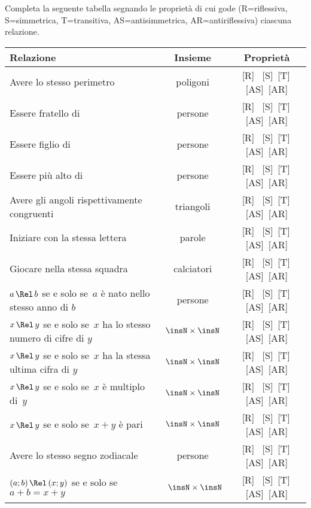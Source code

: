 \begin{exrig}
 \begin{esempio}

Completa la seguente tabella segnando le proprietà di cui gode (R=riflessiva, S=simmetrica, T=transitiva, AS=antisimmetrica, AR=antiriflessiva) ciascuna relazione.

\begin{center}
\begin{tabular}{lcc}
\toprule
Relazione & Insieme & Proprietà \\
\midrule
Avere lo stesso perimetro & poligoni & [R] \, [S]\, [T]\, [AS]\, [AR] \\
Essere fratello di & persone & [R] \, [S]\, [T]\, [AS]\, [AR] \\
Essere figlio di & persone & [R] \, [S]\, [T]\, [AS]\, [AR] \\
Essere più alto di & persone & [R] \, [S]\, [T]\, [AS]\, [AR] \\
Avere gli angoli rispettivamente congruenti & triangoli & [R] \, [S]\, [T]\, [AS]\, [AR] \\
Iniziare con la stessa lettera & parole & [R] \, [S]\, [T]\, [AS]\, [AR] \\
Giocare nella stessa squadra & calciatori & [R] \, [S]\, [T]\, [AS]\, [AR] \\
$a \,\Rel\, b$ se e solo se~$a$ è nato nello stesso anno di $b$ & persone & [R] \, [S]\, [T]\, [AS]\, [AR] \\
$x \,\Rel\, y$ se e solo se~$x$ ha lo stesso numero di cifre di $y$ & $\insN \times \insN $ &[R] \, [S]\, [T]\, [AS]\, [AR] \\
$x \,\Rel\, y$ se e solo se~$x$ ha la stessa ultima cifra di $y$ & $\insN \times \insN $ &[R] \, [S]\, [T]\, [AS]\, [AR] \\
$x \,\Rel\, y$ se e solo se~$x$ è multiplo di~$y$ & $\insN \times \insN $ &[R] \, [S]\, [T]\, [AS]\, [AR] \\
$x \,\Rel\, y$ se e solo se~$x+y$ è pari & $\insN \times \insN $ &[R] \, [S]\, [T]\, [AS]\, [AR] \\
Avere lo stesso segno zodiacale & persone & [R] \, [S]\, [T]\, [AS]\, [AR] \\
$(a;b) \,\Rel\, (x;y)$ se e solo se~$a+b=x+y$ & ~$\insN \times \insN$ & [R] \, [S]\, [T]\, [AS]\, [AR] \\
\bottomrule
\end{tabular}
\end{center}


\end{esempio}
\end{exrig}
